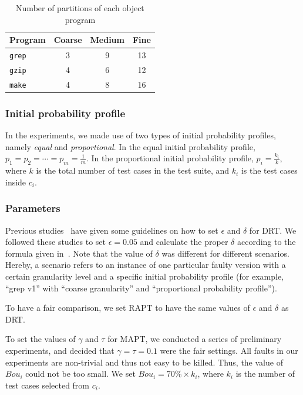 \documentclass[10pt,journal,compsoc]{IEEEtran}
\begin{document}
\begin{table}
\caption{Number of partitions of each object program}
\label{tab:gra}
\centering
\begin{tabular}{|l|c|c|c|} \hline
Program				& Coarse	& Medium	& Fine	\\ \hline
\texttt{grep}	& 3				& 9				& 13		\\ \hline
\texttt{gzip}	& 4				& 6				& 12		\\ \hline
\texttt{make}	& 4				& 8				& 16		\\ \hline
\end{tabular}
\end{table}

\subsubsection{Initial probability profile}
In the experiments, we made use of two types of initial probability profiles, namely \textit{equal} and \textit{proportional}. In the equal initial probability profile, $p_1 = p_2 = \cdots = p_m = \displaystyle\frac{1}{m}$. In the proportional initial probability profile, $p_i = \displaystyle\frac{k_i}{k}$, where $k$ is the total number of test cases in the test suite, and $k_i$ is the test cases inside $c_i$.

\subsubsection{Parameters}
Previous studies~\cite{Lv11, Yang14, Li15} have given some guidelines on how to set $\epsilon$ and $\delta$ for DRT. We followed these studies to set $\epsilon = 0.05$ and calculate the proper $\delta$ according to the formula given in~\cite{Li15}. Note that the value of $\delta$ was different for different scenarios. Hereby, a scenario refers to an instance of one particular faulty version with a certain granularity level and a specific initial probability profile (for example, ``grep v1'' with ``coarse granularity'' and ``proportional probability profile'').

To have a fair comparison, we set RAPT to have the same values of $\epsilon$ and $\delta$ as DRT.

To set the values of $\gamma$ and $\tau$ for MAPT, we conducted a series of preliminary experiments, and decided that $\gamma = \tau = 0.1$ were the fair settings. All faults in our experiments are non-trivial and thus not easy to be killed. Thus, the value of $Bou_i$ could not be too small. We set $Bou_i = 70\% \times k_i$, where $k_i$ is the number of test cases selected from $c_i$.
\end{document}
